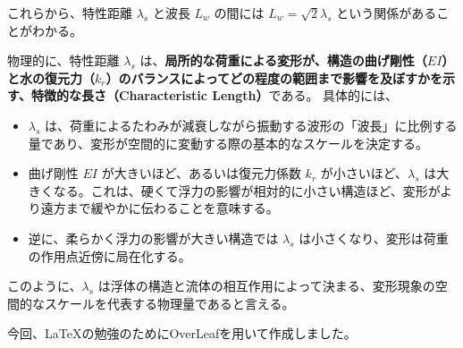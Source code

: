 \documentclass[dvipdfmx,a4paper]{jsarticle}
\begin{document}
    これらから、特性距離 $\lambda_s$ と波長 $L_w$ の間には $L_w = \sqrt{2}\lambda_s$ という関係があることがわかる。
    
    物理的に、特性距離 $\lambda_s$ は、\textbf{局所的な荷重による変形が、構造の曲げ剛性（$EI$）と水の復元力（$k_r$）のバランスによってどの程度の範囲まで影響を及ぼすかを示す、特徴的な長さ（Characteristic Length）}である。
    具体的には、
    \begin{itemize}
        \item $\lambda_s$ は、荷重によるたわみが減衰しながら振動する波形の「波長」に比例する量であり、変形が空間的に変動する際の基本的なスケールを決定する。
        \item 曲げ剛性 $EI$ が大きいほど、あるいは復元力係数 $k_r$ が小さいほど、$\lambda_s$ は大きくなる。これは、硬くて浮力の影響が相対的に小さい構造ほど、変形がより遠方まで緩やかに伝わることを意味する。
        \item 逆に、柔らかく浮力の影響が大きい構造では $\lambda_s$ は小さくなり、変形は荷重の作用点近傍に局在化する。
    \end{itemize}
    このように、$\lambda_s$ は浮体の構造と流体の相互作用によって決まる、変形現象の空間的なスケールを代表する物理量であると言える。

\vspace{2cm}
今回、\LaTeX の勉強のためにOverLeafを用いて作成しました。
\end{document}
